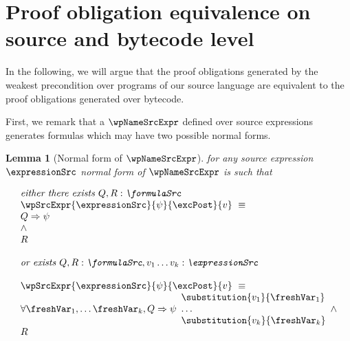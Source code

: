 

\newtheorem{wpExprSrc}{Lemma}[section]
\newtheorem{exprValueOnStack1}[wpExprSrc]{Lemma}[section]
\newtheorem{exprSrcBcWp1}[wpExprSrc]{Lemma}[section]
\newtheorem{exprSrcBcWp2}[wpExprSrc]{Lemma}[section]
\newtheorem{wpStmtBcSrc1}[wpExprSrc]{Lemma}
\newtheorem{wpStmtBcSrc2}[wpExprSrc]{Lemma}


\section{Proof obligation equivalence on source and bytecode level}\label{pogEq:aux}

In the following, we will argue that the proof obligations generated by the weakest precondition
over programs of our source language are equivalent to the  proof obligations generated over bytecode.

First, we remark that a $\wpNameSrcExpr$ defined over source  expressions generates formulas which may
 have two possible normal forms.


\begin{wpExprSrc}[Normal form of $\wpNameSrcExpr$] \label{pogEq:aux:wpExprSrc}
for any source expression $\expressionSrc$ 
normal form of  $\wpNameSrcExpr$ is such that 

$$ \begin{array}{l}
         \mbox{\rm\textit{either  there exists $ Q,R:\formulaSrc $  }} \\
         \wpSrcExpr{\expressionSrc }{ \psi }{ \excPost}{v} \  \equiv \\ 
          Q \Rightarrow \psi \\
          \wedge \\ 
	  R \\\\
	  \mbox{\rm\textit{or exists $ Q,R:\formulaSrc, v_1 \ldots v_k :\expressionSrc $   }} \\
\\
 \wpSrcExpr{\expressionSrc }{ \psi }{ \excPost}{v} \  \equiv \\
      \forall \freshVar_1, \ldots  \freshVar_k   ,  Q \Rightarrow \psi 
                                                                             \begin{array}{l}
									        \substitution{v_1 }{ \freshVar_1 }  \\
										\ldots \\
										\substitution{v_k}{ \freshVar_k } 
									     \end{array}
          \wedge \\ 
	  R  
   \end{array}  $$ \\
\end{wpExprSrc}

